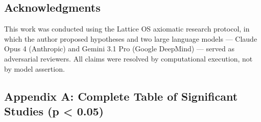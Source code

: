 \documentclass[
  11pt,
]{article}
\begin{document}
\subsection{Acknowledgments}\label{acknowledgments}

This work was conducted using the Lattice OS axiomatic research
protocol, in which the author proposed hypotheses and two large language
models --- Claude Opus 4 (Anthropic) and Gemini 3.1 Pro (Google
DeepMind) --- served as adversarial reviewers. All claims were resolved
by computational execution, not by model assertion.

\subsection{Appendix A: Complete Table of Significant Studies (p
\textless{}
0.05)}\label{appendix-a-complete-table-of-significant-studies-p-0.05}

\small
\end{document}

